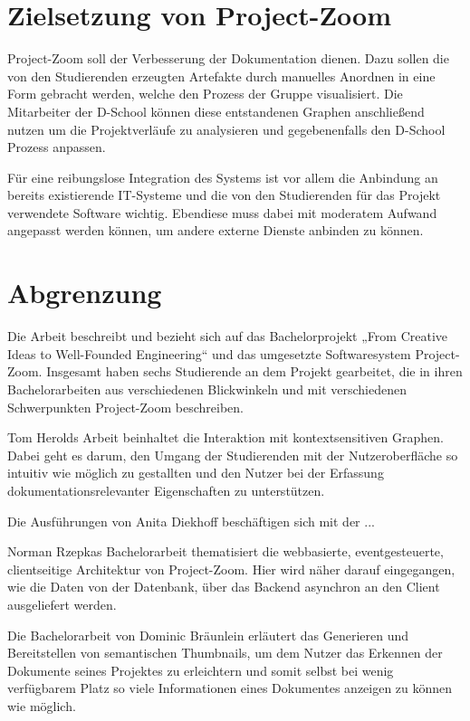 \section{Zielsetzung von Project-Zoom}
Project-Zoom soll der Verbesserung der Dokumentation dienen. Dazu sollen die von den Studierenden erzeugten Artefakte durch manuelles Anordnen in eine Form gebracht werden, welche den Prozess der Gruppe visualisiert. Die Mitarbeiter der D-School können diese entstandenen Graphen anschließend nutzen um die Projektverläufe zu analysieren und gegebenenfalls den D-School Prozess anpassen.

Für eine reibungslose Integration des Systems ist vor allem die Anbindung an bereits existierende IT-Systeme und die von den Studierenden für das Projekt verwendete Software wichtig. Ebendiese muss dabei mit moderatem Aufwand angepasst werden können, um andere externe Dienste anbinden zu können.

\section{Abgrenzung}
Die Arbeit beschreibt und bezieht sich auf das Bachelorprojekt „From Creative Ideas to Well-Founded Engineering“ und das umgesetzte Softwaresystem Project-Zoom. Insgesamt haben sechs Studierende an dem Projekt gearbeitet, die in ihren Bachelorarbeiten aus verschiedenen Blickwinkeln und mit verschiedenen Schwerpunkten Project-Zoom beschreiben.

Tom Herolds Arbeit \cite{bp-tomh} beinhaltet die Interaktion mit kontextsensitiven Graphen. Dabei geht es darum, den Umgang der Studierenden mit der Nutzeroberfläche so intuitiv wie möglich zu gestallten und den Nutzer bei der Erfassung dokumentationsrelevanter Eigenschaften zu unterstützen.

Die Ausführungen von Anita Diekhoff \cite{bp-anita}  beschäftigen sich mit der ...

Norman Rzepkas Bachelorarbeit \cite{bp-norman} thematisiert die webbasierte, eventgesteuerte, clientseitige Architektur von Project-Zoom. Hier wird näher darauf eingegangen, wie die Daten von der Datenbank, über das Backend asynchron an den Client ausgeliefert werden.

Die Bachelorarbeit von Dominic Bräunlein \cite{bp-dome} erläutert das Generieren und Bereitstellen von semantischen \gls{Thumbnails}, um dem Nutzer das Erkennen der Dokumente seines Projektes zu erleichtern und somit selbst bei wenig verfügbarem Platz so viele Informationen eines Dokumentes anzeigen zu können wie möglich. 

